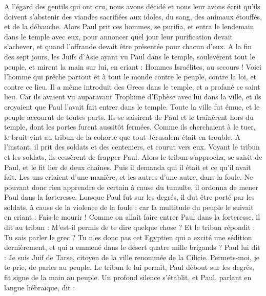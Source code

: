\begin{multicols}{2}
A l'égard des gentils qui ont cru, nous avons décidé et nous leur avons écrit qu’ils doivent s’abstenir des viandes sacrifiées aux idoles, du sang, des animaux étouffés, et de la débauche.
Alors Paul prit ces hommes, se purifia, et entra le lendemain dans le temple avec eux, pour annoncer quel jour leur purification devait s'achever, et quand l’offrande devait être présentée pour chacun d’eux.
A la fin des sept jours, les Juifs d'Asie ayant vu Paul dans le temple, soulevèrent tout le peuple, et mirent la main sur lui,
en criant : Hommes Israélites, au secours ! Voici l’homme qui prêche partout et à tout le monde contre le peuple, contre la loi, et contre ce lieu. Il a même introduit des Grecs dans le temple, et a profané ce saint lieu.
Car ils avaient vu auparavant Trophime d’Ephèse avec lui dans la ville, et ils croyaient que Paul l'avait fait entrer dans le temple.
Toute la ville fut émue, et le peuple accourut de toutes parts. Ils se saisirent de Paul et le traînèrent hors du temple, dont les portes furent aussitôt fermées.
Comme ils cherchaient à le tuer, le bruit vint au tribun de la cohorte que tout Jérusalem était en trouble.
A l’instant, il prit des soldats et des centeniers, et courut vers eux. Voyant le tribun et les soldats, ils cessèrent de frapper Paul.
Alors le tribun s’approcha, se saisit de Paul, et le fit lier de deux chaînes. Puis il demanda qui il était et ce qu’il avait fait.
Les uns criaient d'une manière, et les autres d'une autre, dans la foule. Ne pouvant donc rien apprendre de certain à cause du tumulte, il ordonna de mener Paul dans la forteresse.
Lorsque Paul fut sur les degrés, il dut être porté par les soldats, à cause de la violence de la foule ;
car la multitude du peuple le suivait en criant : Fais-le mourir !
Comme on allait faire entrer Paul dans la forteresse, il dit au tribun : M’est-il permis de te dire quelque chose ? Et le tribun répondit : Tu sais parler le grec ?
Tu n’es donc pas cet Egyptien qui a excité une sédition dernièrement, et qui a emmené dans le désert quatre mille brigands ?
Paul lui dit : Je suis Juif de Tarse, citoyen de la ville renommée de la Cilicie. Permets-moi, je te prie, de parler au peuple.
Le tribun le lui permit, Paul débout sur les degrés, fit signe de la main au peuple. Un profond silence s’établit, et Paul, parlant en langue hébraïque, dit :
\end{multicols}
